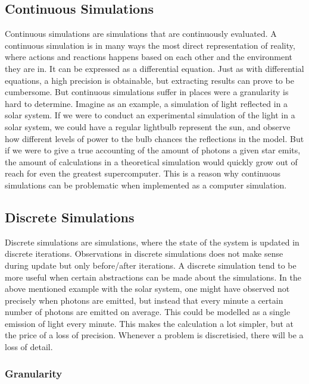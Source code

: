 \subsection{Continuous Simulations}
Continuous simulations are simulations that are continuously evaluated. A continuous simulation is in many ways the most direct representation of reality, where actions and reactions happens based on each other and the environment they are in. It can be expressed as a differential equation. Just as with differential equations, a high precision is obtainable, but extracting results can prove to be cumbersome. But continuous simulations suffer in places were a granularity is hard to determine. Imagine as an example, a simulation of light reflected in a solar system. If we were to conduct an experimental simulation of the light in a solar system, we could have a regular lightbulb represent the sun, and observe how different levels of power to the bulb chances the reflections in the model. But if we were to give a true accounting of the amount of photons a given star emits, the amount of calculations in a theoretical simulation would quickly grow out of reach for even the greatest supercomputer. This is a reason why continuous simulations can be problematic when implemented as a computer simulation.
\label{simulationchoise}


\subsection{Discrete Simulations}
Discrete simulations are simulations, where the state of the system is updated in discrete iterations. Observations in discrete simulations does not make sense during update but only before/after iterations. A discrete simulation tend to be more useful when certain abstractions can be made about the simulations. In the above mentioned example with the solar system, one might have observed not precisely when photons are emitted, but instead that every minute a certain number of photons are emitted on average. This could be modelled as a single emission of light every minute. This makes the calculation a lot simpler, but at the price of a loss of precision. Whenever a problem is discretisied, there will be a loss of detail.




\subsubsection{Granularity}

